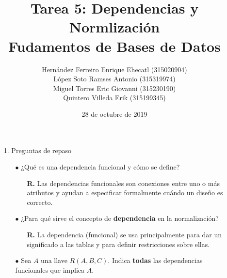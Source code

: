 \documentclass[12pt, letterpaper]{article}
\author{Hernández Ferreiro Enrique Ehecatl (315020904) \\
        López Soto Ramses Antonio (315319974) \\
        Miguel Torres Eric Giovanni (315230190) \\
        Quintero Villeda Erik (315199345)}
\title{Tarea 5: Dependencias y Normlización \\
       {\small Fudamentos de Bases de Datos}}
\date{28 de octubre de 2019}
\begin{document}
    \maketitle

    \begin{itemize}
    
        \item[1.]   Preguntas de repaso
        \begin{itemize}

            
                \item[$\bullet$]    ¿Qué es una dependencia funcional y cómo se 
                                    define? \vspace{.2cm}
                
                                    \begin{itemize}

                                        \item[\textbf{R.}]  Las dependencias funcionales
                                                            son conexiones entre uno o más 
                                                            atributos y ayudan a especificar
                                                            formalmente cuándo un diseño es
                                                            correcto. 

                                    \end{itemize} 

                \item[$\bullet$]    ¿Para qué sirve el concepto de \textbf{dependencia} en la 
                                    normalización?

                                    \begin{itemize}
                                    
                                        \item[\textbf{R.}]  La dependencia (funcional) se usa
                                                            principalmente para dar un significado
                                                            a las tablas y para definir
                                                            restricciones sobre ellas. 
                                          
                                    \end{itemize}

                \item[$\bullet$]    Sea $A$ una llave $R(A,B,C)$. Indica \textbf{todas} las 
                                    dependencias funcionales que implica \textbf{$A$}.


\end{itemize}
\end{itemize}
\end{document}
